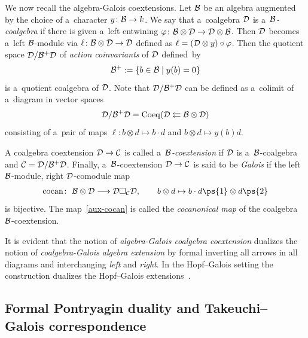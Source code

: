 We now recall the algebra-Galois coextensions.
Let ${\cal B}$ be an algebra augmented by the choice of a~character $y\colon  {\cal B}\rightarrow k$.
We say that a~coalgebra ${\cal D}$ is a~\emph{${\cal B}$-coalgebra} if there is given a~left entwining $\varphi\colon {\cal
B}\otimes {\cal D}\rightarrow {\cal D}\otimes {\cal B}$.
Then ${\cal D}$ becomes a~left ${\cal B}$-module via $\ell\colon {\cal B} \otimes {\cal D} \to {\cal D}$ def\/ined as
$\ell=({\cal D}\otimes y)\circ \varphi$.
Then the quotient space ${\cal D}/{\cal B}^{+}{\cal D}$ of \emph{action coinvariants} of ${\cal D}$ def\/ined~by
\begin{gather*}
{\cal B}^{+}:=\{b \in {\cal B} \mid y(b)=0\}
\end{gather*}
is a~quotient coalgebra of ${\cal D}$.
Note that ${\cal D}/{\cal B}^{+}{\cal D}$ can be def\/ined as a~colimit of a~diagram in vector spaces
\begin{gather*}
{\cal D}/{\cal B}^{+}{\cal D}={\rm Coeq}({\cal D}\leftleftarrows {\cal B}\otimes {\cal D})
\end{gather*}
consisting of a~pair of maps $\ell\colon b\otimes d\mapsto b\cdot d$ and $b\otimes d\mapsto y(b)d$.

A coalgebra coextension ${\cal D}\to{\cal C}$ is called a~\emph{${\cal B}$-coextension} if ${\cal D}$ is a~${\cal
B}$-coalgebra and ${\cal C} ={\cal D}/{\cal B}^{+}{\cal D}$.
Finally, a~${\cal B}$-coextension ${\cal D}\to{\cal C}$ is said to be \emph{Galois} if the left ${\cal B}$-module, right
${\cal D}$-comodule map
\begin{gather}
\label{aux-cocan}
\operatorname{cocan}\colon \ {\cal B}\otimes {\cal D}\longrightarrow {\cal D}\Box_{\cal C}{\cal D},
\qquad
b\otimes d\mapsto b\cdot d\ps{1}\otimes d\ps{2}
\end{gather}
is bijective.
The map~\eqref{aux-cocan} is called the \emph{cocanonical map} of the coalgebra ${\cal B}$-coextension.

It is evident that the notion of \emph{algebra-Galois coalgebra coextension} dualizes the notion of
\emph{coalgebra-Galois algebra extension} by formal inverting all arrows in all diagrams and interchanging \emph{left}
and \emph{right}.
In the Hopf--Galois setting the construction dualizes the Hopf--Galois extensions~\cite{Schn93}.

\subsection{Formal Pontryagin duality and Takeuchi--Galois correspondence}\label{subsect-Pontryagin-dual}

